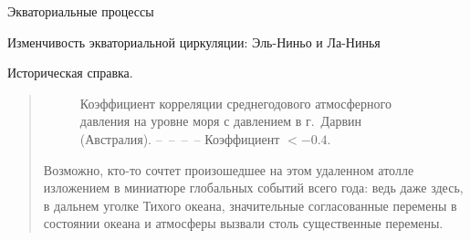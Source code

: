 \begin{chapter}{Экваториальные процессы}
\begin{section}{Изменчивость экваториальной циркуляции: Эль-Ниньо и Ла-Нинья}
\begin{paragraph}{Историческая справка.}
\begin{quotation}
\begin{figure}[b!]
\begin{center}
\end{center}
\caption{Коэффициент корреляции среднегодового атмосферного давления на уровне
моря с давлением в г.~Дарвин (Австралия). 
--\ --\ --\ -- Коэффициент $< -0.4$. \cite{Trenberth:1987}}
\label{fig:ensocorrelations}
\end{figure}
%
%

Возможно, кто-то сочтет произошедшее на этом удаленном атолле изложением 
в миниатюре глобальных событий всего года: ведь даже здесь, в дальнем уголке
Тихого океана, значительные согласованные перемены в состоянии океана и
атмосферы вызвали столь существенные перемены.
%


\end{quotation}
\end{paragraph}
\end{section}
\end{chapter}
